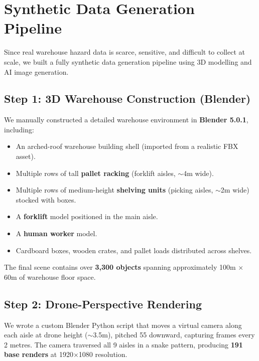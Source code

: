 \documentclass[12pt, a4paper]{article}
\begin{document}
\section{Synthetic Data Generation Pipeline}

Since real warehouse hazard data is scarce, sensitive, and difficult to collect at scale, we built a fully synthetic data generation pipeline using 3D modelling and AI image generation.

\subsection{Step 1: 3D Warehouse Construction (Blender)}

We manually constructed a detailed warehouse environment in \textbf{Blender 5.0.1}, including:

\begin{itemize}
    \item An arched-roof warehouse building shell (imported from a realistic FBX asset).
    \item Multiple rows of tall \textbf{pallet racking} (forklift aisles, $\sim$4m wide).
    \item Multiple rows of medium-height \textbf{shelving units} (picking aisles, $\sim$2m wide) stocked with boxes.
    \item A \textbf{forklift} model positioned in the main aisle.
    \item A \textbf{human worker} model.
    \item Cardboard boxes, wooden crates, and pallet loads distributed across shelves.
\end{itemize}

The final scene contains over \textbf{3,300 objects} spanning approximately 100m $\times$ 60m of warehouse floor space.

\subsection{Step 2: Drone-Perspective Rendering}

We wrote a custom Blender Python script that moves a virtual camera along each aisle at drone height ($\sim$3.5m), pitched 55\textdegree{} downward, capturing frames every 2 metres. The camera traversed all 9 aisles in a snake pattern, producing \textbf{191 base renders} at 1920$\times$1080 resolution.
\end{document}
